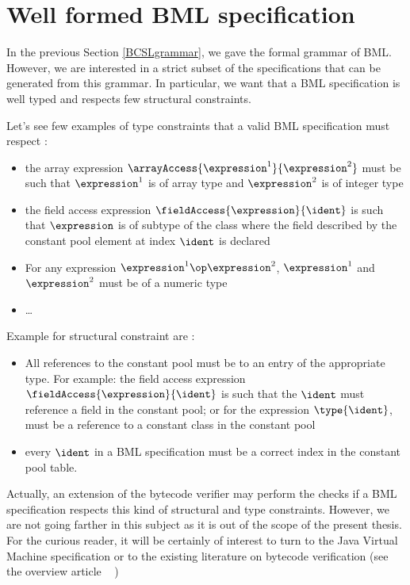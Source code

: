 
\newcommand{\getType}{\mbox{\rm\textsf{getType}}}
\newcommand{\constType}{\mbox{\rm\textsf{constType}}}
\newcommand{\getClass}{\mbox{\rm\textsf{getClass}}}
\newcommand{\application}{\mbox{\rm\textbf{CLS}}}
 
\section{Well formed BML specification}
In the previous Section \ref{BCSLgrammar}, we gave the formal grammar of BML.
However, we are interested in a strict subset of 
the specifications that can be generated from this grammar. In particular, we want that a
BML specification is well typed and respects few structural constraints.


Let's see few examples of type constraints that  a valid BML specification must respect : 
\begin{itemize}
    \item  the array expression $\arrayAccess{\expression^1}{\expression^2}$ must be such that 
$\expression^1$ is of array type and $\expression^2$  is of integer type
    \item the field access expression  $\fieldAccess{\expression}{\ident}$ is such that $\expression$ is of subtype
    of the class where the field described by the constant pool element at index $\ident$ is declared
    \item For any expression $ \expression^1 \op \expression^2$,  $ \expression^1$ and $ \expression^2$ must be of
          a numeric type

    \item \ldots
\end{itemize}

Example for structural constraint are :
\begin{itemize}
    \item All references to the constant pool must be to an entry of the appropriate type. For example:
          the field access expression  $\fieldAccess{\expression}{\ident}$ is such that the
	  $\ident$ must reference a field in the constant pool; or for the expression $\type{\ident}$, \ident
	  must be a reference to a constant class in the constant pool
    \item every $\ident$ in a BML specification must be a correct index in the constant pool table. 
    
\end{itemize}

Actually, an extension of the bytecode verifier may perform the checks
 if a BML specification  respects this kind of structural and type constraints.
However, we are not going farther in this subject as it is out of the scope of the present thesis.
For the curious reader, it will be certainly of interest to turn to the Java Virtual Machine specification  \cite{VMSpec} 
or to the existing literature on bytecode verification (see the overview article ~\cite{Ljbc} )
 







